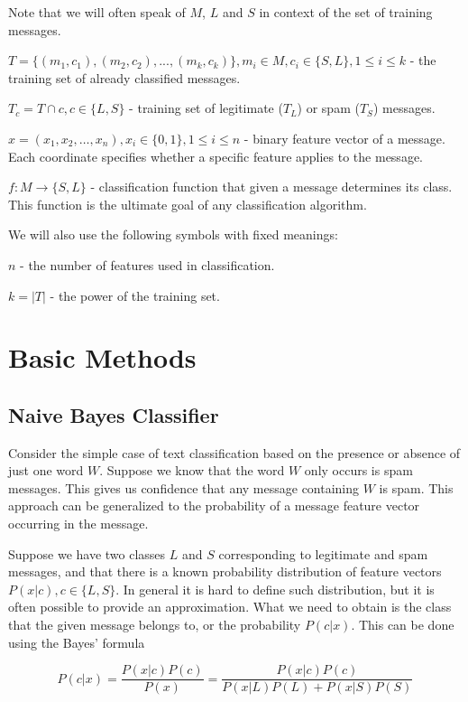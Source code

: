 \documentclass[12pt]{report}
\begin{document}
Note that we will often speak of $M$, $L$ and $S$ in context of the set of training messages.

$T = \{(m_1, c_1), (m_2, c_2), ..., (m_k, c_k)\}, m_i \in M, c_i \in \{S, L\}, 1 \leq i \leq k$ - the training set of already classified messages.

$T_c = T \cap c, c \in \{L, S\}$ - training set of legitimate ($T_L$) or spam ($T_S$) messages.

$x = (x_1, x_2, \dots, x_n), x_i \in \{0, 1\}, 1 \leq i \leq n$ - binary feature vector of a message. Each coordinate specifies whether a specific feature applies to the message.

$f : M \rightarrow \{S, L\}$ - classification function that given a message determines its class. This function is the ultimate goal of any classification algorithm.

We will also use the following symbols with fixed meanings:

$n$ - the number of features used in classification.

$k = |T|$ - the power of the training set.

\newpage


\chapter{Basic Methods}

\section{Naive Bayes Classifier}

Consider the simple case of text classification based on the presence or absence of just one word $W$. Suppose we know that the word $W$ only occurs is spam messages. This gives us confidence that any message containing $W$ is spam. This approach can be generalized to the probability of a message feature vector occurring in the message.

Suppose we have two classes $L$ and $S$ corresponding to legitimate and spam messages, and that there is a known probability distribution of feature vectors $P(x | c), c \in \{L, S\}$. In general it is hard to define such distribution, but it is often possible to provide an approximation. What we need to obtain is the class that the given message belongs to, or the probability $P(c | x)$. This can be done using the Bayes' formula

$$P(c | x) = \dfrac{P(x | c) P(c)}{P(x)} = \dfrac{P(x | c) P(c)}{P(x | L) P(L) + P(x | S) P(S)}$$
\end{document}
